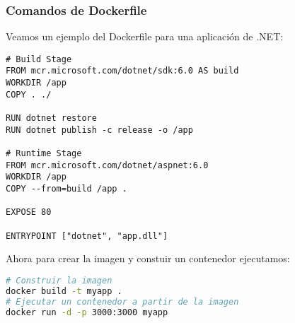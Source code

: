 \documentclass{article}
\begin{document}
\subsubsection*{Comandos de Dockerfile}
Veamos un ejemplo del Dockerfile para una aplicación de .NET:
\begin{lstlisting}
# Build Stage
FROM mcr.microsoft.com/dotnet/sdk:6.0 AS build
WORKDIR /app
COPY . ./

RUN dotnet restore
RUN dotnet publish -c release -o /app

# Runtime Stage
FROM mcr.microsoft.com/dotnet/aspnet:6.0
WORKDIR /app
COPY --from=build /app .

EXPOSE 80

ENTRYPOINT ["dotnet", "app.dll"]
\end{lstlisting}

Ahora para crear la imagen y constuir un contenedor ejecutamos:

\begin{lstlisting}[language=bash]
# Construir la imagen
docker build -t myapp .
# Ejecutar un contenedor a partir de la imagen
docker run -d -p 3000:3000 myapp
\end{lstlisting}
\end{document}
